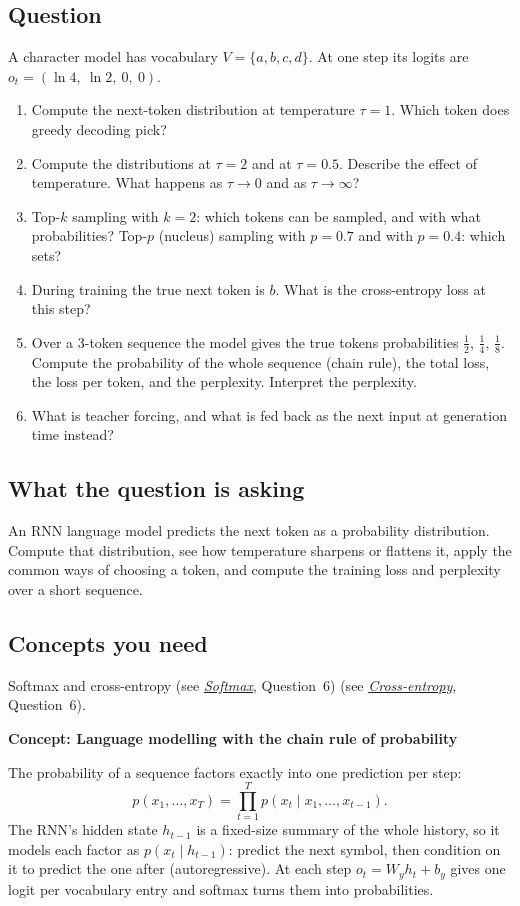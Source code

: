 \documentclass[12pt,a4paper]{article}
\newcommand{\concept}[2]{\par\medskip\phantomsection\label{#1}{\large\bfseries\color{blue!50!black} Concept: #2}\par}
\newcommand{\seeconcept}[3]{(see \hyperref[#1]{\textit{#2}}, Question~#3)}
\begin{document}
\subsection*{Question}
A character model has vocabulary $V=\{a,b,c,d\}$. At one step its logits are $o_t=(\ln4,\ \ln2,\ 0,\ 0)$.
\begin{enumerate}[label=(\alph*)]
\item Compute the next-token distribution at temperature $\tau=1$. Which token does greedy decoding pick?
\item Compute the distributions at $\tau=2$ and at $\tau=0.5$. Describe the effect of temperature. What happens as $\tau\to0$ and as $\tau\to\infty$?
\item Top-$k$ sampling with $k=2$: which tokens can be sampled, and with what probabilities? Top-$p$ (nucleus) sampling with $p=0.7$ and with $p=0.4$: which sets?
\item During training the true next token is $b$. What is the cross-entropy loss at this step?
\item Over a 3-token sequence the model gives the true tokens probabilities $\tfrac12$, $\tfrac14$, $\tfrac18$. Compute the probability of the whole sequence (chain rule), the total loss, the loss per token, and the perplexity. Interpret the perplexity.
\item What is teacher forcing, and what is fed back as the next input at generation time instead?
\end{enumerate}

\subsection*{What the question is asking}
An RNN language model predicts the next token as a probability distribution. Compute that distribution, see how temperature sharpens or flattens it, apply the common ways of choosing a token, and compute the training loss and perplexity over a short sequence.

\subsection*{Concepts you need}
Softmax and cross-entropy \seeconcept{c:softmax}{Softmax}{6} \seeconcept{c:ce}{Cross-entropy}{6}.

\concept{c:lmchain}{Language modelling with the chain rule of probability}
The probability of a sequence factors exactly into one prediction per step:
\[
p(x_1,\dots,x_T)=\prod_{t=1}^Tp(x_t\mid x_1,\dots,x_{t-1}).
\]
The RNN's hidden state $h_{t-1}$ is a fixed-size summary of the whole history, so it models each factor as $p(x_t\mid h_{t-1})$: predict the next symbol, then condition on it to predict the one after (autoregressive). At each step $o_t=W_yh_t+b_y$ gives one logit per vocabulary entry and softmax turns them into probabilities.
\end{document}
